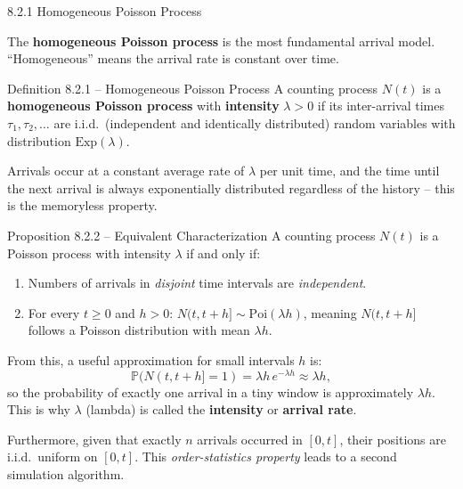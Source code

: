 \documentclass[aspectratio=169,10pt]{beamer}
\newcommand{\Prob}{\mathbb{P}}
\begin{document}
\begin{frame}[allowframebreaks]{8.2.1 Homogeneous Poisson Process}

The \textbf{homogeneous Poisson process} is the most fundamental arrival model.
``Homogeneous'' means the arrival rate is constant over time.

\begin{block}{Definition 8.2.1 -- Homogeneous Poisson Process}
A counting process $N(t)$ is a \textbf{homogeneous Poisson process} with
\textbf{intensity} $\lambda > 0$ if its inter-arrival times
$\tau_1, \tau_2, \ldots$ are i.i.d.\ (independent and identically distributed)
random variables with distribution $\mathrm{Exp}(\lambda)$.
\end{block}

Arrivals occur at a constant average rate of $\lambda$ per unit time, and the
time until the next arrival is always exponentially distributed regardless of
the history -- this is the memoryless property.

\begin{block}{Proposition 8.2.2 -- Equivalent Characterization}
A counting process $N(t)$ is a Poisson process with intensity $\lambda$ if and
only if:
\begin{enumerate}
  \item Numbers of arrivals in \emph{disjoint} time intervals are \emph{independent}.
  \item For every $t \ge 0$ and $h > 0$: $N(t, t+h] \sim \mathrm{Poi}(\lambda h)$,
        meaning $N(t, t+h]$ follows a Poisson distribution with mean $\lambda h$.
\end{enumerate}
\end{block}

From this, a useful approximation for small intervals $h$ is:
\[
  \Prob(N(t, t+h] = 1) = \lambda h\,e^{-\lambda h} \approx \lambda h,
\]
so the probability of exactly one arrival in a tiny window is approximately
$\lambda h$.  This is why $\lambda$ (lambda) is called the \textbf{intensity}
or \textbf{arrival rate}.

Furthermore, given that exactly $n$ arrivals occurred in $[0,t]$, their positions
are i.i.d.\ uniform on $[0,t]$.  This \emph{order-statistics property} leads to
a second simulation algorithm.

\framebreak


\end{frame}
\end{document}
